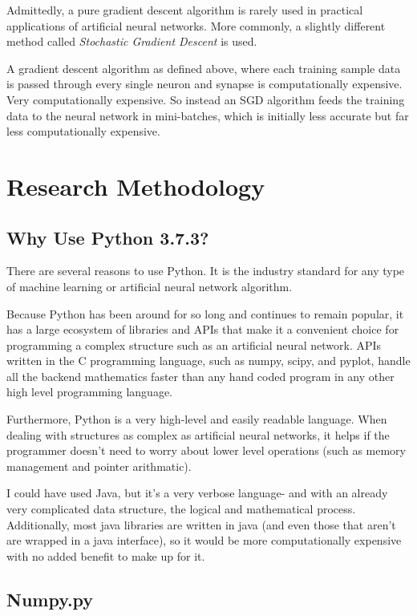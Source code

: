 \documentclass[12pt]{article}
\begin{document}
Admittedly, a pure gradient descent algorithm is rarely used in practical applications of artificial neural networks. More commonly, a slightly different method called \textit{Stochastic Gradient Descent} is used.

A gradient descent algorithm as defined above, where each training sample data is passed through every single neuron and synapse is computationally expensive. Very computationally expensive. So instead an SGD algorithm feeds the training data to the neural network in mini-batches, which is initially less accurate but far less computationally expensive.

\section{Research Methodology \label{methodology}}


\subsection{Why Use Python 3.7.3?}

There are several reasons to use Python. It is the industry standard for any type of machine learning or artificial neural network algorithm.

Because Python has been around for so long and continues to remain popular, it has a large ecosystem of libraries and APIs that make it a convenient choice for programming a complex structure such as an artificial neural network. APIs written in the C programming language, such as numpy, scipy, and pyplot, handle all the backend mathematics faster than any hand coded program in any other high level programming language.

Furthermore, Python is a very high-level and easily readable language. When dealing with structures as complex as artificial neural networks, it helps if the programmer doesn't need to worry about lower level operations (such as memory management and pointer arithmatic).

I could have used Java, but it's a very verbose language- and with an already very complicated data structure, the logical and mathematical process. Additionally, most java libraries are written in java (and even those that aren't are wrapped in a java interface), so it would be more computationally expensive with no added benefit to make up for it.

\subsection{Numpy.py}
\end{document}
